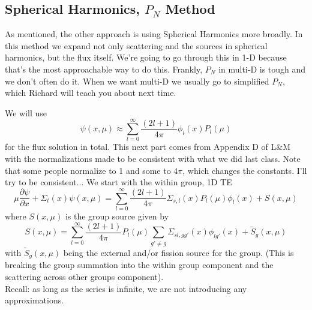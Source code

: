\documentclass[12pt]{article}
\begin{document}
\subsection*{Spherical Harmonics, $P_N$ Method}
As mentioned, the other approach is using Spherical Harmonics more broadly. In this method we expand not only scattering and the sources in spherical harmonics, but the flux itself. We're going to go through this in 1-D because that's the most approachable way to do this. Frankly, $P_N$ in multi-D is tough and we don't often do it. When we want multi-D we usually go to simplified $P_N$, which Richard will teach you about next time. 

We will use
\[
\psi(x, \mu) \approx \sum_{l=0}^{\infty} \frac{(2l+1)}{4\pi} \phi_l(x)P_l(\mu)
\]
for the flux solution in total. This next part comes from Appendix D of L\&M with the normalizations made to be consistent with what we did last class. Note that some people normalize to 1 and some to $4\pi$, which changes the constants. I'll try to be consistent... We start with the within group, 1D TE
\[
\mu \frac{\partial \psi}{\partial x} + \Sigma_t(x)\psi(x,\mu) = \sum_{l=0}^{\infty} \frac{(2l+1)}{4\pi} \Sigma_{s,l}(x) P_l(\mu)\phi_l(x) + S(x,\mu)
\]
where $S(x,\mu)$ is the group source given by
\[
S(x,\mu) = \sum_{l=0}^{\infty} \frac{(2l+1)}{4\pi} P_l(\mu) \sum_{g' \neq g} \Sigma_{sl,gg'}(x) \phi_{lg'}(x) + \tilde{S}_g(x,\mu)
\]
with $\tilde{S}_g(x,\mu)$ being the external and/or fission source for the group. 
(This is breaking the group summation into the within group component and the scattering across other groups component).\\
Recall: as long as the series is infinite, we are not introducing any approximations.
\end{document}
